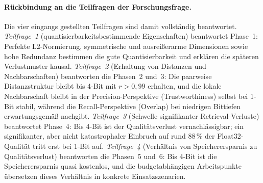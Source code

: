 \paragraph{Rückbindung an die Teilfragen der Forschungsfrage.}
Die vier eingangs gestellten Teilfragen sind damit vollständig beantwortet.
\emph{Teilfrage~1} (quantisierbarkeitsbestimmende Eigenschaften) beantwortet Phase~1: Perfekte L2-Normierung, symmetrische und ausreißerarme Dimensionen sowie hohe Redundanz bestimmen die gute Quantisierbarkeit und erklären die späteren Verlustmuster kausal.
\emph{Teilfrage~2} (Erhaltung von Distanzen und Nachbarschaften) beantworten die Phasen~2 und~3: Die paarweise Distanzstruktur bleibt bis 4-Bit mit $r > 0{,}99$ erhalten, und die lokale Nachbarschaft bleibt in der Precision-Perspektive (Trustworthiness) selbst bei 1-Bit stabil, während die Recall-Perspektive (Overlap) bei niedrigen Bittiefen erwartungsgemäß nachgibt.
\emph{Teilfrage~3} (Schwelle signifikanter Retrieval-Verluste) beantwortet Phase~4: Bis 4-Bit ist der Qualitätsverlust vernachlässigbar; ein signifikanter, aber nicht katastrophaler Einbruch auf rund 88\,\% der Float32-Qualität tritt erst bei 1-Bit auf.
\emph{Teilfrage~4} (Verhältnis von Speicherersparnis zu Qualitätsverlust) beantworten die Phasen~5 und~6: Bis 4-Bit ist die Speicherersparnis quasi kostenlos, und die budgetabhängigen Arbeitspunkte übersetzen dieses Verhältnis in konkrete Einsatzszenarien.

